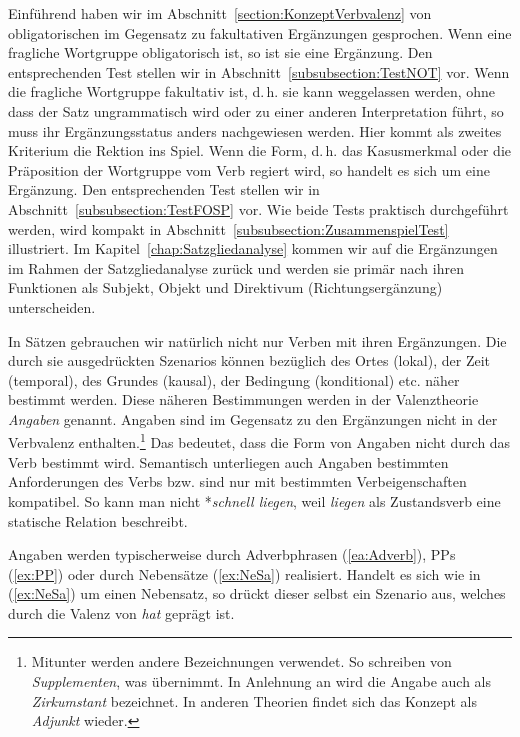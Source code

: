 Einführend haben wir im Abschnitt~\ref{section:KonzeptVerbvalenz} von obligatorischen im Gegensatz zu fakultativen Ergänzungen gesprochen. Wenn eine fragliche Wortgruppe obligatorisch ist, so ist sie eine Ergänzung. Den entsprechenden Test stellen wir in Abschnitt~\ref{subsubsection:TestNOT} vor. Wenn die fragliche Wortgruppe fakultativ ist, d.\,h. sie kann weggelassen werden, ohne dass der Satz ungrammatisch wird oder zu einer anderen Interpretation führt, so muss ihr Ergänzungsstatus anders nachgewiesen werden. Hier kommt als zweites Kriterium die Rektion ins Spiel. Wenn die Form, d.\,h. das Kasusmerkmal oder die Präposition der Wortgruppe vom Verb regiert wird, so handelt es sich um eine Ergänzung. Den entsprechenden Test stellen wir in Abschnitt~\ref{subsubsection:TestFOSP} vor. Wie beide Tests praktisch durchgeführt werden, wird kompakt in Abschnitt~\ref{subsubsection:ZusammenspielTest} illustriert. Im Kapitel~\ref{chap:Satzgliedanalyse} kommen wir auf die Ergänzungen im Rahmen der Satzgliedanalyse zurück und werden sie primär nach ihren Funktionen als Subjekt, Objekt und Direktivum (Richtungsergänzung) unterscheiden.

In Sätzen gebrauchen wir natürlich nicht nur Verben mit ihren Ergänzungen. Die durch sie ausgedrückten Szenarios können bezüglich des Ortes (lokal), der Zeit (temporal), des Grundes (kausal), der Bedingung (konditional) etc. näher bestimmt werden. Diese näheren Bestimmungen werden in der Valenztheorie \textit{Angaben} genannt. Angaben sind im Gegensatz zu den Ergänzungen nicht in der Verbvalenz enthalten.\footnote{Mitunter werden andere Bezeichnungen verwendet. So schreiben \citet{ZifHoffStr1997} von \textit{Supplementen}, was \citet{Agel2017} übernimmt. In Anlehnung an \citet{Tesniere1980deutsch} wird die Angabe auch als \textit{Zirkumstant} bezeichnet. In anderen Theorien findet sich das Konzept als \textit{Adjunkt} wieder.} Das bedeutet, dass die Form von Angaben nicht durch das Verb bestimmt wird. Semantisch unterliegen auch Angaben bestimmten Anforderungen des Verbs bzw. sind nur mit bestimmten Verbeigenschaften kompatibel. So kann man nicht *\textit{schnell liegen}, weil \textit{liegen} als Zustandsverb eine statische Relation beschreibt.

Angaben werden typischerweise durch Adverbphrasen (\ref{ea:Adverb}), PPs (\ref{ex:PP}) oder durch Nebensätze (\ref{ex:NeSa}) realisiert. Handelt es sich wie in (\ref{ex:NeSa}) um einen Nebensatz, so drückt dieser selbst ein Szenario aus, welches durch die Valenz von \textit{hat} geprägt ist. 

